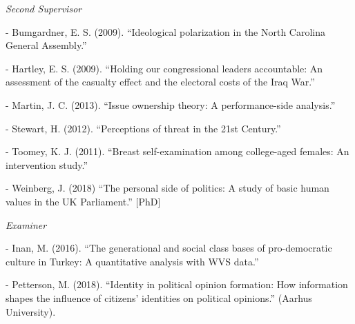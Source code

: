 \documentclass[12pt]{article}
\newcommand{\halfblankline}{\quad\vspace{-0.5\baselineskip}\pagebreak[3]}
\begin{document}
\emph{Second Supervisor}
\begin{innerlist}
	\item[-] Bumgardner, E. S. (2009). ``Ideological polarization in the 
                North Carolina General Assembly.''
    
    \item[-] Hartley, E. S. (2009). ``Holding our congressional 
                leaders accountable: An assessment of the casualty 
                effect and the electoral costs of the Iraq War.''


                
    \item[-] Martin, J. C. (2013). ``Issue ownership theory: A performance-side analysis.''

	\item[-] Stewart, H. (2012). ``Perceptions of threat in the 21st Century.''
	
	\item[-] Toomey, K. J. (2011). ``Breast self-examination among college-aged females: 
                An intervention study.''
                
	\item[-] Weinberg, J. (2018) ``The personal side of politics: A study 
				of basic human values in the UK Parliament.'' [PhD]
\end{innerlist}

\halfblankline

\emph{Examiner}
\begin{innerlist}
      \item[-] Inan, M. (2016). ``The generational and social class bases of pro-democratic 
                	culture in Turkey: A quantitative analysis with WVS data.''

		\item[-] Petterson, M. (2018). ``Identity in political opinion formation: 
		How information shapes the influence of citizens' identities on political opinions.'' (Aarhus University).      
       
\end{innerlist}

\halfblankline
 
\end{document}
